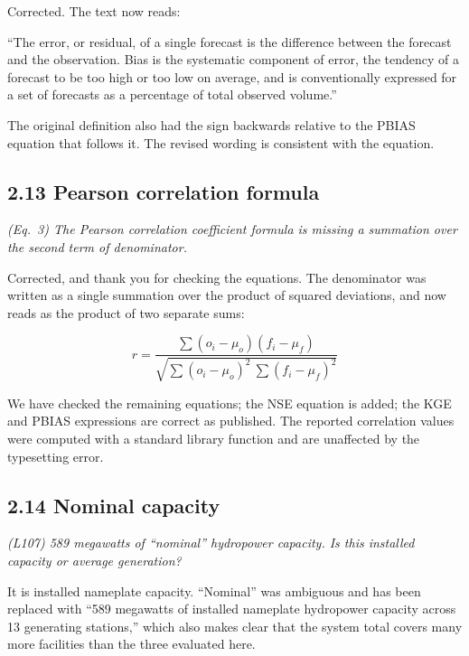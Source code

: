 \documentclass[11pt]{article}
\newenvironment{rc}%
  {\begin{list}{}{\setlength{\leftmargin}{1.5em}\setlength{\rightmargin}{1.5em}%
   \setlength{\topsep}{0.2em}\setlength{\parsep}{0pt}\setlength{\itemsep}{0pt}}%
   \item[]\itshape\color{quotegray}}%
  {\end{list}}
\newenvironment{newtext}%
  {\begin{list}{}{\setlength{\leftmargin}{1.5em}\setlength{\rightmargin}{1.5em}%
   \setlength{\topsep}{0.2em}\setlength{\parsep}{0pt}\setlength{\itemsep}{0pt}}%
   \item[]}%
  {\end{list}}
\begin{document}
Corrected. The text now reads:

\begin{newtext}
``The error, or residual, of a single forecast is the difference between the forecast and the
observation. Bias is the systematic component of error, the tendency of a forecast to be too
high or too low on average, and is conventionally expressed for a set of forecasts as a
percentage of total observed volume.''
\end{newtext}

The original definition also had the sign backwards relative to the PBIAS equation that
follows it. The revised wording is consistent with the equation.

\subsection*{2.13 Pearson correlation formula}

\begin{rc}
(Eq.\ 3) The Pearson correlation coefficient formula is missing a summation over the
second term of denominator.
\end{rc}

Corrected, and thank you for checking the equations. The denominator was written as a single
summation over the product of squared deviations, and now reads as the product of two separate
sums:

\begin{newtext}
\[
r = \frac{\sum(o_i-\mu_o)(f_i-\mu_f)}
         {\sqrt{\sum(o_i-\mu_o)^2\ \sum(f_i-\mu_f)^2}}
\]
\end{newtext}

We have checked the remaining equations; the NSE equation is added; the KGE and PBIAS expressions are correct as
published. The reported correlation values were computed with a standard library function and
are unaffected by the typesetting error.

\subsection*{2.14 Nominal capacity}

\begin{rc}
(L107) 589 megawatts of ``nominal'' hydropower capacity. Is this installed capacity or
average generation?
\end{rc}

It is installed nameplate capacity. ``Nominal'' was ambiguous and has been replaced with ``589
megawatts of installed nameplate hydropower capacity across 13 generating stations,'' which also
makes clear that the system total covers many more facilities than the three evaluated here.
\end{document}
